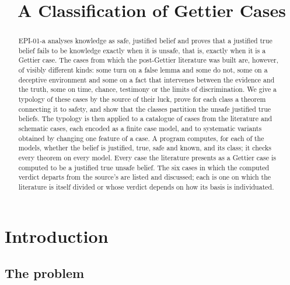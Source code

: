 \documentclass{situationist-preprint}
\title{A Classification of Gettier Cases}
\begin{document}
\maketitle

\begin{abstract}
EPI-01-a analyses knowledge as safe, justified belief and proves that a justified true belief fails to be knowledge exactly when it is unsafe, that is, exactly when it is a Gettier case. The cases from which the post-Gettier literature was built are, however, of visibly different kinds: some turn on a false lemma and some do not, some on a deceptive environment and some on a fact that intervenes between the evidence and the truth, some on time, chance, testimony or the limits of discrimination. We give a typology of these cases by the source of their luck, prove for each class a theorem connecting it to safety, and show that the classes partition the unsafe justified true beliefs. The typology is then applied to a catalogue of \stnlit{} cases from the literature and \stnschem{} schematic cases, each encoded as a finite case model, and to \stnvariants{} systematic variants obtained by changing one feature of a case. A program computes, for each of the \stnmodels{} models, whether the belief is justified, true, safe and known, and its class; it checks every theorem on every model. Every case the literature presents as a Gettier case is computed to be a justified true unsafe belief. The six cases in which the computed verdict departs from the source's are listed and discussed; each is one on which the literature is itself divided or whose verdict depends on how its basis is individuated.
\end{abstract}

\section{Introduction}

\subsection{The problem}
\end{document}
